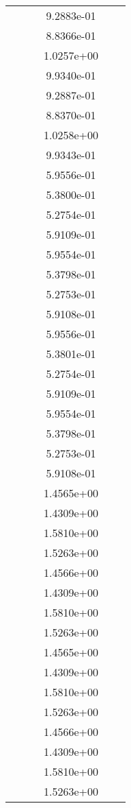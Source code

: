 \begin{xltabular}{\textwidth}{r|rS[table-format=1.3e+2]S[table-format=1.4e+2]S[table-format=1.4e+2]S[table-format=-1.5]}
&  &  & 9.2883e-01 & & \\
&  &  & 8.8366e-01 & & \\
&  &  & 1.0257e+00 & & \\
&  &  & 9.9340e-01 & & \\
&  &  & 9.2887e-01 & & \\
&  &  & 8.8370e-01 & & \\
&  &  & 1.0258e+00 & & \\
&  &  & 9.9343e-01 & & \\
&  &  & 5.9556e-01 & & \\
&  &  & 5.3800e-01 & & \\
&  &  & 5.2754e-01 & & \\
&  &  & 5.9109e-01 & & \\
&  &  & 5.9554e-01 & & \\
&  &  & 5.3798e-01 & & \\
&  &  & 5.2753e-01 & & \\
&  &  & 5.9108e-01 & & \\
&  &  & 5.9556e-01 & & \\
&  &  & 5.3801e-01 & & \\
&  &  & 5.2754e-01 & & \\
&  &  & 5.9109e-01 & & \\
&  &  & 5.9554e-01 & & \\
&  &  & 5.3798e-01 & & \\
&  &  & 5.2753e-01 & & \\
&  &  & 5.9108e-01 & & \\
&  &  & 1.4565e+00 & & \\
&  &  & 1.4309e+00 & & \\
&  &  & 1.5810e+00 & & \\
&  &  & 1.5263e+00 & & \\
&  &  & 1.4566e+00 & & \\
&  &  & 1.4309e+00 & & \\
&  &  & 1.5810e+00 & & \\
&  &  & 1.5263e+00 & & \\
&  &  & 1.4565e+00 & & \\
&  &  & 1.4309e+00 & & \\
&  &  & 1.5810e+00 & & \\
&  &  & 1.5263e+00 & & \\
&  &  & 1.4566e+00 & & \\
&  &  & 1.4309e+00 & & \\
&  &  & 1.5810e+00 & & \\
&  &  & 1.5263e+00 & & \\

\end{xltabular}
